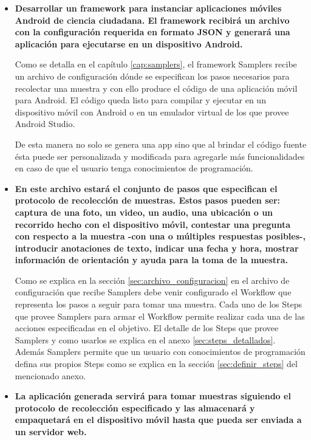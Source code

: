 \begin{itemize} 
  \item \textbf{Desarrollar un framework para instanciar aplicaciones móviles Android de ciencia ciudadana. El framework recibirá un archivo con la configuración requerida en formato JSON y generará una aplicación para ejecutarse en un dispositivo Android.}

Como se detalla en el capítulo \ref{cap:samplers}, el framework Samplers recibe un archivo de configuración dónde se especifican los pasos necesarios para recolectar una muestra y con ello produce el código de una aplicación móvil para Android. El código queda listo para compilar y ejecutar en un dispositivo móvil con Android o en un emulador virtual de los que provee Android Studio.

De esta manera no solo se genera una app sino que al brindar el código fuente ésta puede ser personalizada y modificada para agregarle más funcionalidades en caso de que el usuario tenga conocimientos de programación.
  
  
    \item \textbf{En este archivo estará el conjunto de pasos que especifican el protocolo de recolección de muestras. Estos pasos pueden ser:
captura de una foto, un video, un audio, una ubicación o un recorrido hecho con el dispositivo móvil, contestar una pregunta con respecto a la muestra -con una o múltiples respuestas posibles-, introducir anotaciones de texto, indicar una fecha y hora, mostrar información de orientación y ayuda para la toma de la muestra.			}
  
Como se explica en la sección \ref{sec:archivo_configuracion} en el archivo de configuración que recibe Samplers debe venir configurado el Workflow que representa los pasos a seguir para tomar una muestra. Cada uno de los Steps que provee Samplers para armar el Workflow permite realizar cada una de las acciones especificadas en el objetivo. El detalle de los Steps que provee Samplers y como usarlos se explica en el anexo \ref{sec:steps_detallados}. Además Samplers permite que un usuario con conocimientos de programación defina sus propios Steps como se explica en la sección \ref{sec:definir_steps} del mencionado anexo.


  \item \textbf{La aplicación generada servirá para tomar muestras siguiendo el protocolo de recolección especificado y las almacenará y empaquetará en el dispositivo móvil hasta que pueda ser enviada a un servidor web.}
  

\end{itemize}
